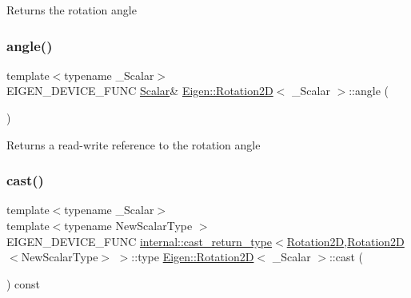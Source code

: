 \begin{DoxyReturn}{Returns}
the rotation angle 
\end{DoxyReturn}
\mbox{\label{class_eigen_1_1_rotation2_d_ac91b3210ee741ca2cf1b2e4acc100672}} 
\subsubsection{\texorpdfstring{angle()}{angle()}\hspace{0.1cm}{\footnotesize\ttfamily [2/2]}}
{\footnotesize\ttfamily template$<$typename \+\_\+\+Scalar$>$ \\
E\+I\+G\+E\+N\+\_\+\+D\+E\+V\+I\+C\+E\+\_\+\+F\+U\+NC \mbox{\hyperlink{class_eigen_1_1_rotation2_d_ac20c665ece0f197a712a2a39ae72e4e4}{Scalar}}\& \mbox{\hyperlink{class_eigen_1_1_rotation2_d}{Eigen\+::\+Rotation2D}}$<$ \+\_\+\+Scalar $>$\+::angle (\begin{DoxyParamCaption}{ }\end{DoxyParamCaption})\hspace{0.3cm}{\ttfamily [inline]}}

\begin{DoxyReturn}{Returns}
a read-\/write reference to the rotation angle 
\end{DoxyReturn}
\mbox{\label{class_eigen_1_1_rotation2_d_a7a2057f37733b0d153f542fffe8207cf}} 
\subsubsection{\texorpdfstring{cast()}{cast()}}
{\footnotesize\ttfamily template$<$typename \+\_\+\+Scalar$>$ \\
template$<$typename New\+Scalar\+Type $>$ \\
E\+I\+G\+E\+N\+\_\+\+D\+E\+V\+I\+C\+E\+\_\+\+F\+U\+NC \mbox{\hyperlink{struct_eigen_1_1internal_1_1cast__return__type}{internal\+::cast\+\_\+return\+\_\+type}}$<$\mbox{\hyperlink{class_eigen_1_1_rotation2_d}{Rotation2D}},\mbox{\hyperlink{class_eigen_1_1_rotation2_d}{Rotation2D}}$<$New\+Scalar\+Type$>$ $>$\+::type \mbox{\hyperlink{class_eigen_1_1_rotation2_d}{Eigen\+::\+Rotation2D}}$<$ \+\_\+\+Scalar $>$\+::cast (\begin{DoxyParamCaption}{ }\end{DoxyParamCaption}) const\hspace{0.3cm}{\ttfamily [inline]}}

